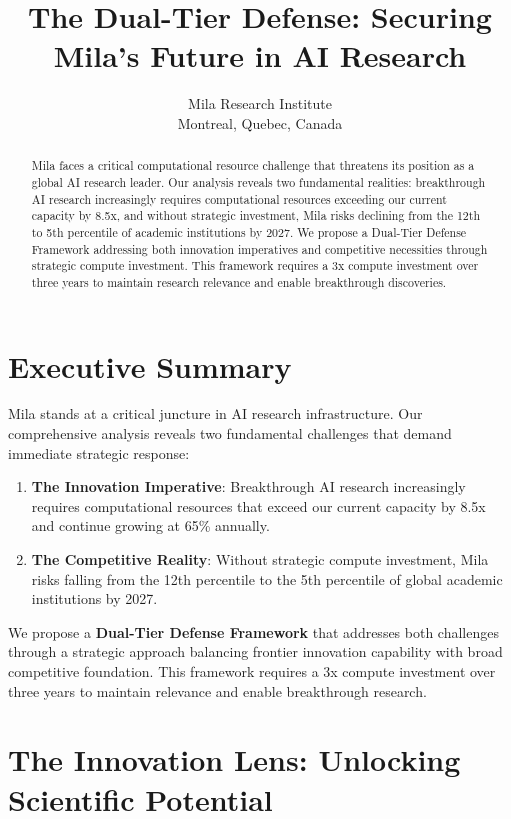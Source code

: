 \documentclass{article}
\title{The Dual-Tier Defense: Securing Mila's Future in AI Research}
\author{%
  Mila Research Institute\\
  Montreal, Quebec, Canada\\
}
\begin{document}
\maketitle


\begin{abstract}
Mila faces a critical computational resource challenge that threatens its position as a global AI research leader. Our analysis reveals two fundamental realities: breakthrough AI research increasingly requires computational resources exceeding our current capacity by 8.5x, and without strategic investment, Mila risks declining from the 12th to 5th percentile of academic institutions by 2027. We propose a Dual-Tier Defense Framework addressing both innovation imperatives and competitive necessities through strategic compute investment. This framework requires a 3x compute investment over three years to maintain research relevance and enable breakthrough discoveries.
\end{abstract}


\section{Executive Summary}

Mila stands at a critical juncture in AI research infrastructure. Our comprehensive analysis reveals two fundamental challenges that demand immediate strategic response:

\begin{enumerate}
\item \textbf{The Innovation Imperative}: Breakthrough AI research increasingly requires computational resources that exceed our current capacity by 8.5x and continue growing at 65\% annually.
\item \textbf{The Competitive Reality}: Without strategic compute investment, Mila risks falling from the 12th percentile to the 5th percentile of global academic institutions by 2027.
\end{enumerate}

We propose a \textbf{Dual-Tier Defense Framework} that addresses both challenges through a strategic approach balancing frontier innovation capability with broad competitive foundation. This framework requires a 3x compute investment over three years to maintain relevance and enable breakthrough research.


\section{The Innovation Lens: Unlocking Scientific Potential}
\end{document}
